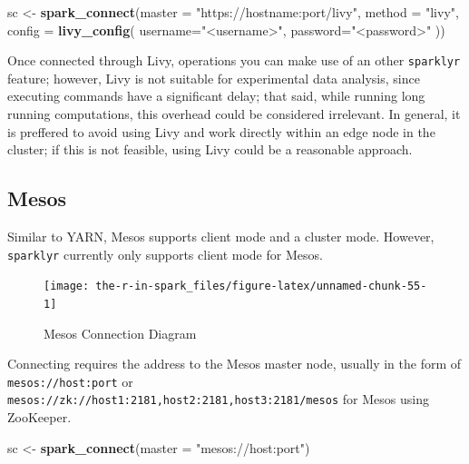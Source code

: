 \documentclass[]{book}
\newenvironment{Shaded}{\begin{snugshade}}{\end{snugshade}}
\newcommand{\DataTypeTok}[1]{\textcolor[rgb]{0.13,0.29,0.53}{#1}}
\newcommand{\KeywordTok}[1]{\textcolor[rgb]{0.13,0.29,0.53}{\textbf{#1}}}
\newcommand{\NormalTok}[1]{#1}
\newcommand{\StringTok}[1]{\textcolor[rgb]{0.31,0.60,0.02}{#1}}
\theoremstyle{definition}
\theoremstyle{definition}
\theoremstyle{definition}
\theoremstyle{remark}
\begin{document}
\begin{Shaded}
\begin{Highlighting}[]
\NormalTok{sc <-}\StringTok{ }\KeywordTok{spark_connect}\NormalTok{(}\DataTypeTok{master =} \StringTok{"https://hostname:port/livy"}\NormalTok{, }\DataTypeTok{method =} \StringTok{"livy"}\NormalTok{, }\DataTypeTok{config =} \KeywordTok{livy_config}\NormalTok{(}
  \DataTypeTok{username=}\StringTok{"<username>"}\NormalTok{,}
  \DataTypeTok{password=}\StringTok{"<password>"}
\NormalTok{))}
\end{Highlighting}
\end{Shaded}

Once connected through Livy, operations you can make use of an other
\texttt{sparklyr} feature; however, Livy is not suitable for
experimental data analysis, since executing commands have a significant
delay; that said, while running long running computations, this overhead
could be considered irrelevant. In general, it is preffered to avoid
using Livy and work directly within an edge node in the cluster; if this
is not feasible, using Livy could be a reasonable approach.

\hypertarget{mesos-1}{%
\subsection{Mesos}\label{mesos-1}}

Similar to YARN, Mesos supports client mode and a cluster mode. However,
\texttt{sparklyr} currently only supports client mode for Mesos.

\begin{figure}

{\centering \texttt{[image: the-r-in-spark\_files/figure-latex/unnamed-chunk-55-1]} 

}

\caption{Mesos Connection Diagram}\label{fig:unnamed-chunk-55}
\end{figure}

Connecting requires the address to the Mesos master node, usually in the
form of \texttt{mesos://host:port} or
\texttt{mesos://zk://host1:2181,host2:2181,host3:2181/mesos} for Mesos
using ZooKeeper.

\begin{Shaded}
\begin{Highlighting}[]
\NormalTok{sc <-}\StringTok{ }\KeywordTok{spark_connect}\NormalTok{(}\DataTypeTok{master =} \StringTok{"mesos://host:port"}\NormalTok{)}
\end{Highlighting}
\end{Shaded}
\end{document}
